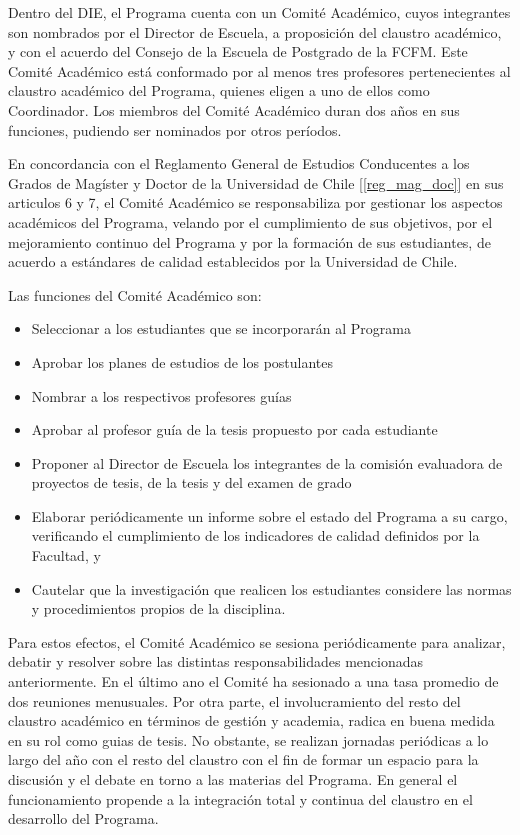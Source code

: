 Dentro del DIE, el Programa cuenta con un Comité Académico, cuyos integrantes son
nombrados por el Director de Escuela, a proposición del claustro académico, y con el acuerdo
del Consejo de la Escuela de Postgrado de la FCFM. Este Comité Académico está conformado por
al menos tres profesores pertenecientes al claustro académico del Programa, quienes eligen a uno
de ellos como Coordinador. Los miembros del Comité Académico duran dos años en sus funciones,
pudiendo ser nominados por otros períodos.

En concordancia con el Reglamento General de Estudios Conducentes a los Grados de
Magíster y Doctor de la Universidad de Chile [\ref{reg_mag_doc}] en sus articulos 6 y 7, el Comité Académico se
responsabiliza por gestionar los aspectos académicos del Programa, velando por el cumplimiento
de sus objetivos, por el mejoramiento continuo del Programa y por la formación de sus estudiantes,
de acuerdo a estándares de calidad establecidos por la Universidad de Chile.

Las funciones del Comité Académico son:

\begin{itemize}
\item Seleccionar a los estudiantes que se incorporarán al Programa
\item Aprobar los planes de estudios de los postulantes
\item Nombrar a los respectivos profesores guías 
\item Aprobar al profesor guía de la tesis propuesto por cada estudiante
\item Proponer al Director de Escuela los integrantes de la comisión evaluadora de proyectos de
tesis, de la tesis y del examen de grado
\item Elaborar periódicamente un informe sobre el estado del Programa a su cargo, verificando el
cumplimiento de los indicadores de calidad definidos por la Facultad, y
\item Cautelar que la investigación que realicen los estudiantes considere las normas y
procedimientos propios de la disciplina.
\end{itemize}

Para estos efectos, el Comité Académico se sesiona periódicamente para analizar, debatir
y resolver sobre las distintas responsabilidades mencionadas anteriormente. En el último ano
el Comité ha sesionado a una tasa promedio de dos reuniones menusuales. Por otra parte, el
involucramiento del resto del claustro académico en términos de gestión y academia, radica en
buena medida en su rol como guias de tesis. No obstante, se realizan jornadas periódicas
a lo largo del año con el resto del claustro con el fin de formar un espacio para la discusión y el
debate en torno a las materias del Programa. En general el funcionamiento propende a la integración
total y continua del claustro en el desarrollo del Programa.

